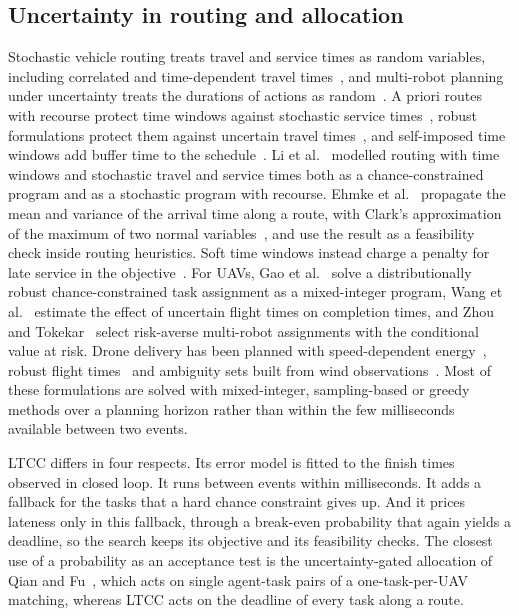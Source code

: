 \documentclass[a4paper,fleqn]{cas-dc}
\newcommand{\mname}{LTCC}  %
\newcommand{\uprighttext}{\def\textbf##1{##1}\def\textit##1{##1}}
\newcommand{\inputtable}[1]{\begingroup\uprighttext\endgroup}
\newcounter{prop}
\begin{document}
\inputtable{tab_related}

\subsection{Uncertainty in routing and allocation}
Stochastic vehicle routing treats travel and service times as random variables, including correlated and
time-dependent travel times~\cite{rostami2021correlated,bomboi2022stochastic}, and multi-robot planning under
uncertainty treats the durations of actions as random~\cite{lacerda2022decision}. A priori routes with recourse
protect time windows against stochastic service times~\cite{errico2016apriori}, robust formulations protect them
against uncertain travel times~\cite{agra2013robust}, and self-imposed time windows add buffer time to the
schedule~\cite{jabali2015selfimposed}. Li et al.~\cite{li2010vrptw} modelled routing with time windows and stochastic
travel and service times both as a chance-constrained program and as a stochastic program with recourse. Ehmke et al.~\cite{ehmke2015ensuring} propagate the mean and variance of the arrival time along a route, with
Clark's approximation of the maximum of two normal variables~\cite{clark1961greatest}, and use the result as a
feasibility check inside routing heuristics. Soft time windows instead charge a penalty for late service in the
objective~\cite{tas2013stochastic}. For UAVs, Gao et al.~\cite{gao2025drcc} solve a distributionally robust
chance-constrained task assignment as a mixed-integer program, Wang et al.~\cite{wang2024uncertain} estimate the effect
of uncertain flight times on completion times, and Zhou and Tokekar~\cite{zhou2022risk} select risk-averse multi-robot
assignments with the conditional value at risk. Drone delivery has been planned with speed-dependent
energy~\cite{dukkanci2021energy}, robust flight times~\cite{bruni2023drone} and ambiguity sets built from wind
observations~\cite{cheng2024weather}. Most of these formulations are solved with mixed-integer, sampling-based or greedy
methods over a planning horizon rather than within the few milliseconds available between two events.

\mname{} differs in four respects. Its error model is fitted to the finish times observed in closed loop. It runs
between events within milliseconds. It adds a fallback for the tasks that a hard chance constraint gives up. And it
prices lateness only in this fallback, through a break-even probability that again yields a deadline, so the search
keeps its objective and its feasibility checks. The closest use of a probability as an acceptance test is the
uncertainty-gated allocation of Qian and Fu~\cite{ucdg2026drones}, which acts on single agent-task pairs of a
one-task-per-UAV matching, whereas \mname{} acts on the deadline of every task along a route.
\end{document}
